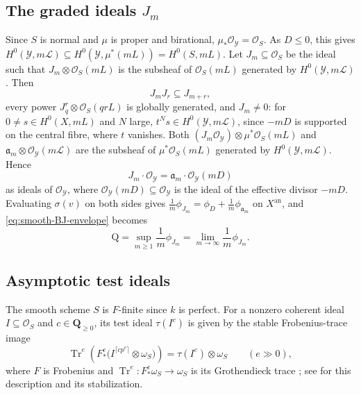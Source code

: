 \documentclass[11pt,a4paper]{article}
\newcommand{\an}{\mathrm{an}}          %
\begin{document}
\subsection*{The graded ideals \texorpdfstring{$J_m$}{Jm}}

Since $S$ is normal and $\mu$ is proper and birational, $\mu_*\mathcal O_{\mathcal Y}=\mathcal O_S$. As $D\le0$, this gives $H^0(\mathcal Y,m\mathcal L)\subseteq H^0(\mathcal Y,\mu^*(mL))=H^0(S,mL)$. Let $J_m\subseteq\mathcal O_S$ be the ideal such that $J_m\otimes\mathcal O_S(mL)$ is the subsheaf of $\mathcal O_S(mL)$ generated by $H^0(\mathcal Y,m\mathcal L)$. Then
\[
J_mJ_r\subseteq J_{m+r},
\]
every power $J_q^r\otimes\mathcal O_S(qrL)$ is globally generated, and $J_m\neq0$: for $0\ne s\in H^0(X,mL)$ and $N$ large, $t^Ns\in H^0(\mathcal Y,m\mathcal L)$, since $-mD$ is supported on the central fibre, where $t$ vanishes. Both $(J_m\mathcal O_{\mathcal Y})\otimes\mu^*\mathcal O_S(mL)$ and $\mathfrak a_m\otimes\mathcal O_{\mathcal Y}(m\mathcal L)$ are the subsheaf of $\mu^*\mathcal O_S(mL)$ generated by $H^0(\mathcal Y,m\mathcal L)$. Hence
\[
 J_m\cdot\mathcal{O}_{\mathcal{Y}}=\mathfrak a_m\cdot\mathcal{O}_{\mathcal{Y}}(mD)
\]
as ideals of $\mathcal O_{\mathcal Y}$, where $\mathcal{O}_\mathcal{Y}(mD)\subseteq\mathcal{O}_\mathcal{Y}$ is the ideal of the effective divisor $-mD$. Evaluating $\sigma(v)$ on both sides gives $\frac1m\phi_{J_m}=\phi_D+\frac1m\phi_{\mathfrak a_m}$ on $X^{\an}$, and \eqref{eq:smooth-BJ-envelope} becomes
\begin{equation}\label{eq:smooth-Q-limit}
 \mathrm Q=\sup_{m\ge1}\frac1m\phi_{J_m}=\lim_{m\to\infty}\frac1m\phi_{J_m}.
\end{equation}

\subsection*{Asymptotic test ideals}

The smooth scheme $S$ is $F$-finite since $k$ is perfect. For a nonzero coherent ideal $I\subseteq\mathcal O_S$ and $c\in\mathbf Q_{\geq0}$, its test ideal $\tau(I^c)$ is given by the stable Frobenius-trace image
\begin{equation}\label{eq:test-def}
 \operatorname{Tr}^e\!\left(F_*^e\bigl(I^{\lceil cp^e\rceil}\otimes\omega_S\bigr)\right)
       =\tau(I^c)\otimes\omega_S\qquad(e\gg0),
\end{equation}
where $F$ is Frobenius and $\operatorname{Tr}^e:F_*^e\omega_S\to\omega_S$ is its Grothendieck trace \cite[\href{https://stacks.math.columbia.edu/tag/0FK6}{Tag 0FK6}]{Stacks}; see \cite[\S3]{MustataTest} for this description and its stabilization.
\end{document}
